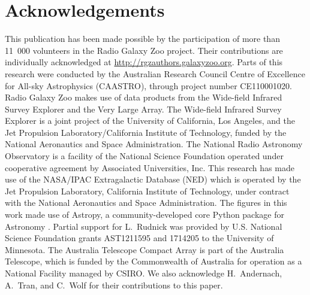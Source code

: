 \documentclass[fleqn,usenatbib,usedcolumn]{mnras}
\begin{document}
\section{Acknowledgements}

  This publication has been made possible by the participation of more than
  11~000 volunteers in the Radio Galaxy Zoo project. Their contributions are
  individually acknowledged at \url{http://rgzauthors.galaxyzoo.org}. Parts of
  this research were conducted by the Australian Research Council Centre of
  Excellence for All-sky Astrophysics (CAASTRO), through project number
  CE110001020. Radio Galaxy Zoo makes use of data products from the Wide-field
  Infrared Survey Explorer and the Very Large Array. The Wide-field Infrared
  Survey Explorer is a joint project of the University of California, Los
  Angeles, and the Jet Propulsion Laboratory/California Institute of
  Technology, funded by the National Aeronautics and Space Administration. The
  National Radio Astronomy Observatory is a facility of the National Science
  Foundation operated under cooperative agreement by Associated Universities,
  Inc. This research has made use of the NASA/IPAC Extragalactic Database
  (NED) which is operated by the Jet Propulsion Laboratory, California
  Institute of Technology, under contract with the National Aeronautics and
  Space Administration. The figures in this work made use of Astropy, a
  community-developed core Python package for Astronomy \citep{astropy}.
  Partial support for L.~Rudnick was provided by U.S. National Science
  Foundation grants AST1211595 and 1714205 to the University of Minnesota. The
  Australia Telescope Compact Array is part of the Australia Telescope, which
  is funded by the Commonwealth of Australia for operation as a National
  Facility managed by CSIRO. We also acknowledge H.~Andernach, A.~Tran, and C.~Wolf for their contributions to this paper.

%




\end{document}
